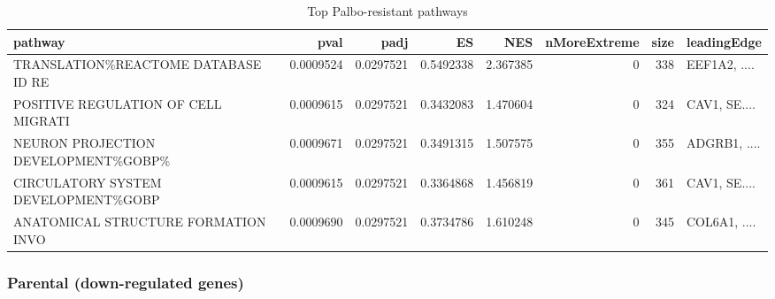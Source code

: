 \documentclass[
]{book}
\newenvironment{Shaded}{\begin{snugshade}}{\end{snugshade}}
\newcommand{\AttributeTok}[1]{\textcolor[rgb]{0.13,0.29,0.53}{#1}}
\newcommand{\CommentTok}[1]{\textcolor[rgb]{0.56,0.35,0.01}{\textit{#1}}}
\newcommand{\DecValTok}[1]{\textcolor[rgb]{0.00,0.00,0.81}{#1}}
\newcommand{\FunctionTok}[1]{\textcolor[rgb]{0.13,0.29,0.53}{\textbf{#1}}}
\newcommand{\NormalTok}[1]{#1}
\newcommand{\OtherTok}[1]{\textcolor[rgb]{0.56,0.35,0.01}{#1}}
\newcommand{\SpecialCharTok}[1]{\textcolor[rgb]{0.81,0.36,0.00}{\textbf{#1}}}
\newcommand{\StringTok}[1]{\textcolor[rgb]{0.31,0.60,0.02}{#1}}
\begin{document}
\begin{table}
\centering
\caption{\label{tab:top-pathways-up}Top Palbo-resistant pathways}
\centering
\fontsize{10}{12}\selectfont
\begin{tabular}[t]{l|r|r|r|r|r|r|l}
\hline
pathway & pval & padj & ES & NES & nMoreExtreme & size & leadingEdge\\
\hline
TRANSLATION\%REACTOME DATABASE ID RE & 0.0009524 & 0.0297521 & 0.5492338 & 2.367385 & 0 & 338 & EEF1A2, ....\\
\hline
POSITIVE REGULATION OF CELL MIGRATI & 0.0009615 & 0.0297521 & 0.3432083 & 1.470604 & 0 & 324 & CAV1, SE....\\
\hline
NEURON PROJECTION DEVELOPMENT\%GOBP\% & 0.0009671 & 0.0297521 & 0.3491315 & 1.507575 & 0 & 355 & ADGRB1, ....\\
\hline
CIRCULATORY SYSTEM DEVELOPMENT\%GOBP & 0.0009615 & 0.0297521 & 0.3364868 & 1.456819 & 0 & 361 & CAV1, SE....\\
\hline
ANATOMICAL STRUCTURE FORMATION INVO & 0.0009690 & 0.0297521 & 0.3734786 & 1.610248 & 0 & 345 & COL6A1, ....\\
\hline
\end{tabular}
\end{table}

\subsubsection{Parental (down-regulated genes)}\label{parental-down-regulated-genes}

\begin{Shaded}
\end{Shaded}
\end{document}

